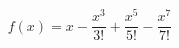 \documentclass[preview]{standalone}
\begin{document}
\begin{align*}
f(x)=x-\dfrac{x^3}{3!}+\dfrac{x^5}{5!}-\dfrac{x^7}{7!}
\end{align*}
\end{document}
